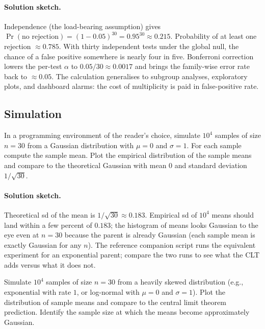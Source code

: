 \paragraph{Solution sketch.}
Independence (the load-bearing assumption) gives
$\Pr(\text{no rejection}) = (1 - 0.05)^{30} = 0.95^{30} \approx
0.215$. Probability of at least one rejection $\approx 0.785$.
With thirty independent tests under the global null, the chance of
a false positive somewhere is nearly four in five. Bonferroni
correction lowers the per-test $\alpha$ to $0.05/30 \approx 0.0017$
and brings the family-wise error rate back to $\approx 0.05$. The
calculation generalises to subgroup analyses, exploratory plots,
and dashboard alarms: the cost of multiplicity is paid in
false-positive rate.

\subsection*{Simulation}

\begin{exercise}
In a programming environment of the reader's choice, simulate
$10^{4}$ samples of size $n = 30$ from a Gaussian distribution with
$\mu = 0$ and $\sigma = 1$. For each sample compute the sample mean.
Plot the empirical distribution of the sample means and compare to
the theoretical Gaussian with mean $0$ and standard deviation
$1/\sqrt{30}$.
\end{exercise}

\paragraph{Solution sketch.}
Theoretical sd of the mean is $1/\sqrt{30} \approx 0.183$.
Empirical sd of $10^{4}$ means should land within a few percent of
$0.183$; the histogram of means looks Gaussian to the eye even at
$n = 30$ because the parent is already Gaussian (each sample mean
is exactly Gaussian for any $n$). The reference companion script
 runs the equivalent experiment for
an exponential parent; compare the two runs to see what the CLT
adds versus what it does not.

\begin{exercise}
Simulate $10^{4}$ samples of size $n = 30$ from a heavily skewed
distribution (e.g., exponential with rate $1$, or log-normal with
$\mu = 0$ and $\sigma = 1$). Plot the distribution of sample means
and compare to the central limit theorem prediction. Identify the
sample size at which the means become approximately Gaussian.
\end{exercise}

